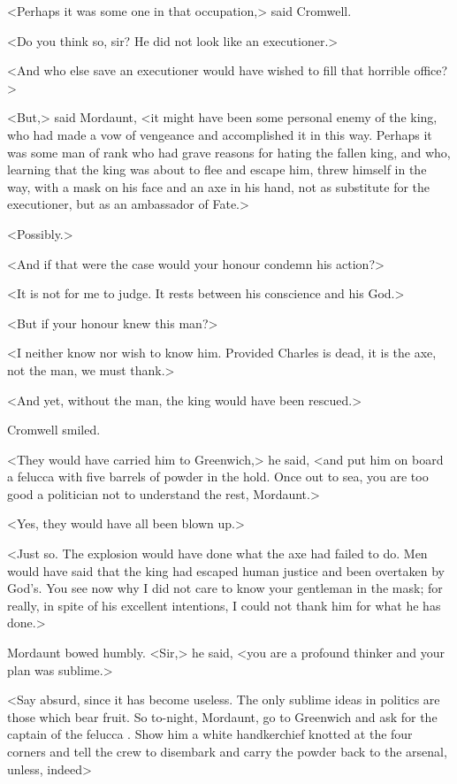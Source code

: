 <Perhaps it was some one in that occupation,> said Cromwell.

<Do you think so, sir? He did not look like an executioner.>

<And who else save an executioner would have wished to fill that horrible office?>

<But,> said Mordaunt, <it might have been some personal enemy of the king, who had made a vow of vengeance and accomplished it in this way. Perhaps it was some man of rank who had grave reasons for hating the fallen king, and who, learning that the king was about to flee and escape him, threw himself in the way, with a mask on his face and an axe in his hand, not as substitute for the executioner, but as an ambassador of Fate.>

<Possibly.>

<And if that were the case would your honour condemn his action?>

<It is not for me to judge. It rests between his conscience and his God.>

<But if your honour knew this man?>

<I neither know nor wish to know him. Provided Charles is dead, it is the axe, not the man, we must thank.>

<And yet, without the man, the king would have been rescued.>

Cromwell smiled.

<They would have carried him to Greenwich,> he said, <and put him on board a felucca with five barrels of powder in the hold. Once out to sea, you are too good a politician not to understand the rest, Mordaunt.>

<Yes, they would have all been blown up.>

<Just so. The explosion would have done what the axe had failed to do. Men would have said that the king had escaped human justice and been overtaken by God's. You see now why I did not care to know your gentleman in the mask; for really, in spite of his excellent intentions, I could not thank him for what he has done.>

Mordaunt bowed humbly. <Sir,> he said, <you are a profound thinker and your plan was sublime.>

<Say absurd, since it has become useless. The only sublime ideas in politics are those which bear fruit. So to-night, Mordaunt, go to Greenwich and ask for the captain of the felucca . Show him a white handkerchief knotted at the four corners and tell the crew to disembark and carry the powder back to the arsenal, unless, indeed\longdash>

